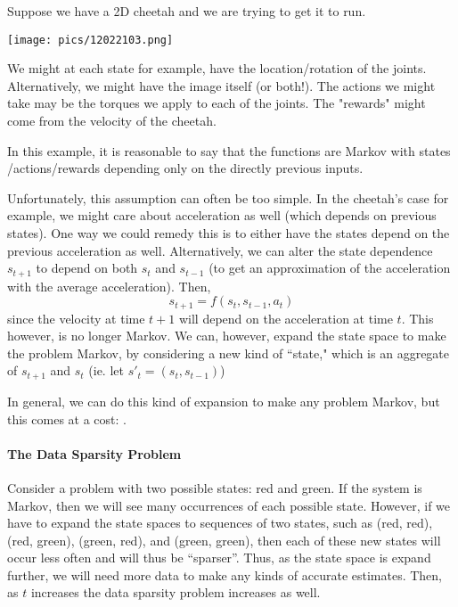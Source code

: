 \documentclass[11pt]{scrartcl}
\begin{document}
\begin{ex}
Suppose we have a 2D cheetah and we are trying to get it to run. 
\begin{center}
    \texttt{[image: pics/12022103.png]}
\end{center}
We might at each state for example, have the location/rotation of the joints. Alternatively, we might have the image itself (or both!). The actions we might take may be the torques we apply to each of the joints. The "rewards" might come from the velocity of the cheetah. 

In this example, it is reasonable to say that the functions are Markov with states /actions/rewards depending only on the directly previous inputs. 
\end{ex}

Unfortunately, this assumption can often be too simple. In the cheetah's case for example, we might care about acceleration as well (which depends on previous states). One way we could remedy this is to either have the states depend on the previous acceleration as well. Alternatively, we can alter the state dependence $s_{t+1}$ to depend on both $s_{t}$ and $s_{t-1}$ (to get an approximation of the acceleration with the average acceleration). Then,
\begin{equation*}
    s_{t+1} = f(s_t,s_{t-1},a_t)
\end{equation*}
since the velocity at time $t+1$ will depend on the acceleration at time $t$. This however, is no longer Markov. We can, however, expand the state space to make the problem Markov, by considering a new kind of ``state," which is an aggregate of $s_{t+1}$ and $s_t$ (ie. let $s'_t=(s_{t},s_{t-1})$)

In general, we can do this kind of expansion to make any problem Markov, but this comes at a cost: .

\paragraph{The Data Sparsity Problem}
Consider a problem with two possible states: red and green. If the system is Markov, then we will see many occurrences of each possible state. However, if we have to expand the state spaces to sequences of two states, such as (red, red), (red, green), (green, red), and (green, green), then each of these new states will occur less often and will thus be ``sparser''. Thus, as the state space is expand further, we will need more data to make any kinds of accurate estimates. Then, as $t$ increases the data sparsity problem increases as well.
\end{document}
